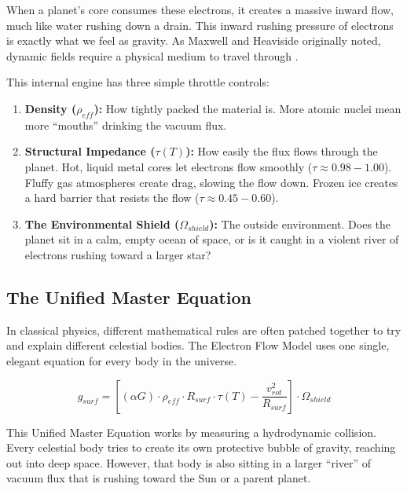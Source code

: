 \documentclass[11pt, a4paper]{article}
\begin{document}
  When a planet's core consumes these electrons, it creates a massive inward flow, much like water rushing down a drain. This inward rushing pressure of electrons is exactly what we feel as gravity. As Maxwell and Heaviside originally noted, dynamic fields require a physical medium to travel through \cite{maxwell1865, heaviside1893}.

  This internal engine has three simple throttle controls:
  \begin{enumerate}
    \item \textbf{Density ($\rho_{eff}$):} How tightly packed the material is. More atomic nuclei mean more ``mouths'' drinking the vacuum flux.
    \item \textbf{Structural Impedance ($\tau(T)$):} How easily the flux flows through the planet. Hot, liquid metal cores let electrons flow smoothly ($\tau \approx 0.98 - 1.00$). Fluffy gas atmospheres create drag, slowing the flow down. Frozen ice creates a hard barrier that resists the flow ($\tau \approx 0.45 - 0.60$).
    \item \textbf{The Environmental Shield ($\Omega_{shield}$):} The outside environment. Does the planet sit in a calm, empty ocean of space, or is it caught in a violent river of electrons rushing toward a larger star?
  \end{enumerate}

\subsection{The Unified Master Equation}
  In classical physics, different mathematical rules are often patched together to try and explain different celestial bodies. The Electron Flow Model uses one single, elegant equation for every body in the universe.

  \begin{equation}
    g_{surf} = \left[ (\alpha G) \cdot \rho_{eff} \cdot R_{surf} \cdot \tau(T) - \frac{v_{rot}^2}{R_{surf}} \right] \cdot \Omega_{shield}
  \end{equation}

  This Unified Master Equation works by measuring a hydrodynamic collision. Every celestial body tries to create its own protective bubble of gravity, reaching out into deep space. However, that body is also sitting in a larger ``river'' of vacuum flux that is rushing toward the Sun or a parent planet. 
  
\end{document}
